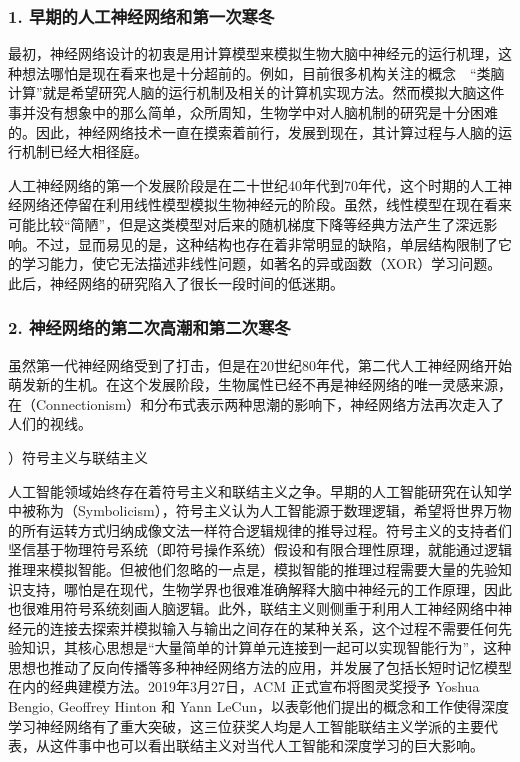 \subsubsection{1. 早期的人工神经网络和第一次寒冬}

\parinterval 最初，神经网络设计的初衷是用计算模型来模拟生物大脑中神经元的运行机理，这种想法哪怕是现在看来也是十分超前的。例如，目前很多机构关注的概念\ \dash \ “类脑计算”就是希望研究人脑的运行机制及相关的计算机实现方法。然而模拟大脑这件事并没有想象中的那么简单，众所周知，生物学中对人脑机制的研究是十分困难的。因此，神经网络技术一直在摸索着前行，发展到现在，其计算过程与人脑的运行机制已经大相径庭。

\parinterval 人工神经网络的第一个发展阶段是在二十世纪40年代到70年代，这个时期的人工神经网络还停留在利用线性模型模拟生物神经元的阶段。虽然，线性模型在现在看来可能比较“简陋”，但是这类模型对后来的随机梯度下降等经典方法产生了深远影响。不过，显而易见的是，这种结构也存在着非常明显的缺陷，单层结构限制了它的学习能力，使它无法描述非线性问题，如著名的异或函数（XOR）学习问题。此后，神经网络的研究陷入了很长一段时间的低迷期。


\subsubsection{2. 神经网络的第二次高潮和第二次寒冬}

\parinterval 虽然第一代神经网络受到了打击，但是在20世纪80年代，第二代人工神经网络开始萌发新的生机。在这个发展阶段，生物属性已经不再是神经网络的唯一灵感来源，在{\small{}}（Connectionism）和分布式表示两种思潮的影响下，神经网络方法再次走入了人们的视线。

\vspace{0.3em}
）符号主义与联结主义
\vspace{0.3em}

\parinterval 人工智能领域始终存在着符号主义和联结主义之争。早期的人工智能研究在认知学中被称为{\small{}}（Symbolicism），符号主义认为人工智能源于数理逻辑，希望将世界万物的所有运转方式归纳成像文法一样符合逻辑规律的推导过程。符号主义的支持者们坚信基于物理符号系统（即符号操作系统）假设和有限合理性原理，就能通过逻辑推理来模拟智能。但被他们忽略的一点是，模拟智能的推理过程需要大量的先验知识支持，哪怕是在现代，生物学界也很难准确解释大脑中神经元的工作原理，因此也很难用符号系统刻画人脑逻辑。此外，联结主义则侧重于利用人工神经网络中神经元的连接去探索并模拟输入与输出之间存在的某种关系，这个过程不需要任何先验知识，其核心思想是“大量简单的计算单元连接到一起可以实现智能行为”，这种思想也推动了反向传播等多种神经网络方法的应用，并发展了包括长短时记忆模型在内的经典建模方法。2019年3月27日，ACM 正式宣布将图灵奖授予 Yoshua Bengio, Geoffrey Hinton 和 Yann LeCun，以表彰他们提出的概念和工作使得深度学习神经网络有了重大突破，这三位获奖人均是人工智能联结主义学派的主要代表，从这件事中也可以看出联结主义对当代人工智能和深度学习的巨大影响。

